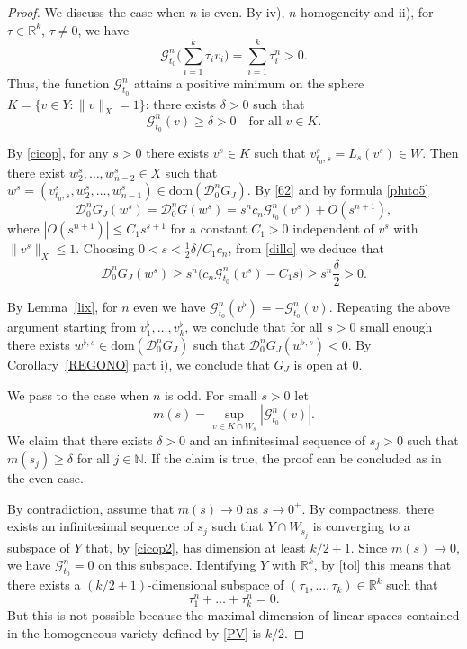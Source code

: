 \documentclass[12pt, reqno]{amsart}
\theoremstyle{plain}
\theoremstyle{definition}
\theoremstyle{remark}
\numberwithin{equation}{section}
\newcommand{\R}{\mathbb{R}}
\newcommand{\N}{\mathbb{N}}
\newcommand{\0}{\theta}
\newcommand{\1}{{-1}}
\renewcommand{\=}{\coloneqq}
\renewcommand{\.}{\dots}
\newcommand{\mc}{\mathcal}
\newcommand{\dom}{\mathrm{dom}}
\newcommand{\be}{\begin{equation}}
\newcommand{\ee}{\end{equation}}
\begin{document}
{\begin{proof}
We discuss the case when $n$ is even. By iv), $n$-homogeneity and ii),
for $\tau \in \R^k$, $\tau \neq 0$, we have 
\be\label{tol}
\mc G^n _{t_0}\Big(\sum_{i=1}^k \tau _i v_i\Big) =\sum_{i=1}^k \tau _i^n
 >0.
\ee
Thus,  the function $\mc G^n _{t_0}$ attains a positive minimum on the sphere $K = \{ v\in Y : \| v\|_X=1\}$: there exists $\delta>0$ such that
\begin{equation}
\label{dillo}
\mc G^n _{t_0}(v) \geq \delta>0\quad \textrm{for all }v\in K.
\end{equation}


By \eqref{cicop}, for any $s>0$ there exists $  v^s  \in K$ such that 
$v^s _{t_0,s} =L_s(v^s)  \in  W$. 
Then there exist $w^s_2,\ldots,w_{n-2}^s\in X$ such that $ w^s = (v^s _{t_0,s},w_2^s,\ldots,w_{n-1}^s)\in  \dom(\mc D _0^n G_J)$.
By \eqref{62} and by formula  \eqref{pluto5}
\[
  \mc D _0^n G_J(w^s)=  \mc D _0^n G(w^s) = s^n c_n  \mc G^n_{t_0} (v^s) +O(s^{n+1}),
\]
where $|O(s^{n+1})|\leq C_1 s^{s+1}$ for a constant $C_1>0$ independent of $v^s$ with  $\|v^s\|_X\leq 1$.
Choosing $0<s<\frac 12 \delta/ C_1 c_n $, from \eqref{dillo} we deduce that
\[
\mc D _0^n G_J (w^s)  \geq  s^n \big (c_n   \mc G^n_{t_0} (v^s) - C_1 s \big )\geq s^n  \frac{\delta}{2}>0.
\]

 
 
 
 By Lemma~\ref{lix}, for $n$ even we have    $\mc G^n _{t_0}(v^\flat )=-\mc G^n  _{t_0}(v)$.
 Repeating the above argument starting from $v_1^\flat,\dots, v_k^\flat$,
 we conclude that for all $s>0$ small enough there exists 
  $w^{\flat,s} \in   \dom(\mc D _0^n G_J)$ such that 
$ \mc D _0^n G_J(w^{\flat,s} ) <0$.
 By Corollary~\ref{REGONO} part i), we conclude that $G_J$ is open at $0$.
 
 
 {\color{black}
 
  
 We pass to the case when $n$ is odd. For small $s>0$ let
  \[
 m(s) =    \sup _{v\in K \cap W_s} |\mc G^n_{t_0}(v) |.
 \]
 We claim that there exists $\delta>0$ and an infinitesimal sequence of $s_j>0$ such that $m(s_j)\geq \delta$ for all $j\in\N$.
 If the claim is true, the proof can be  concluded as in the even case.
 
 
 
 By contradiction, assume that $m(s)\to 0 $ as $s\to 0^+$. 
 By compactness, there exists an infinitesimal sequence of $s_j $ such that $Y\cap W_{s_j}$ is converging
 to a subspace of $Y$ that, by \eqref{cicop2}, has 
 dimension at least  $k/2+1$. Since $m(s)\to 0$, we have   $ \mc G^n_{t_0}=0$ on this subspace.
 Identifying $Y$ with $\R^k$,  by \eqref{tol}
 this means  that there exists 
 a $(k/2+1)$-dimensional subspace of $(\tau_1,\ldots,\tau_k)\in\R^k$ such that
 \be \label{PV}
 \tau_1^n+\ldots+\tau_k^n=0.
\ee
 But this is not possible because the maximal dimension of linear spaces contained in the homogeneous variety defined by \eqref{PV} is $k/2$.
 
 }
   
\end{proof}



} 
\end{document}
